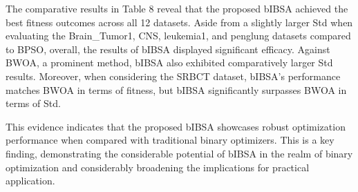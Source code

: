 \documentclass{article} %
\begin{document}
The comparative results in Table 8 reveal that the proposed bIBSA achieved the best fitness outcomes across all 12 datasets. Aside from a slightly larger Std when evaluating the Brain\_Tumor1, CNS, leukemia1, and penglung datasets compared to BPSO, overall, the results of bIBSA displayed significant efficacy. Against BWOA, a prominent method, bIBSA also exhibited comparatively larger Std results. Moreover, when considering the SRBCT dataset, bIBSA's performance matches BWOA in terms of fitness, but bIBSA significantly surpasses BWOA in terms of Std.

This evidence indicates that the proposed bIBSA showcases robust optimization performance when compared with traditional binary optimizers. This is a key finding, demonstrating the considerable potential of bIBSA in the realm of binary optimization and considerably broadening the implications for practical application.
\end{document}

